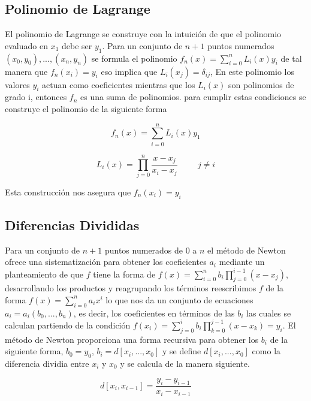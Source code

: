 \documentclass[10pt,twocolumn]{article}
\begin{document}
\subsection{Polinomio de Lagrange} 
El polinomio de Lagrange se construye con la intuici\'on de que el polinomio evaluado en $x_1$ debe ser 
$y_1$. Para un conjunto de $n+1$ puntos numerados $(x_0,y_0),...,(x_n,y_n)$ se formula el polinomio 
$f_n(x)=\sum_{i=0}^{n}L_i(x)y_i$ de tal manera que $f_n(x_i)=y_i$ eso 
implica que $L_i(x_j)=\delta_{ij}$, En este polinomio los valores $y_i$ actuan como coeficientes mientras 
que los $L_i(x)$ son polinomios de grado i, entonces $f_n$ es una suma de polinomios. para cumplir estas 
condiciones se construye 
el polinomio 
de la 
siguiente forma

\begin{equation}
	f_n(x)=\sum_{i=0}^{n}L_i(x)y_1
	\label{polf}
\end{equation}

\begin{equation}
	L_i(x)=\prod_{j=0}^{n}\frac{x-x_j}{x_i-x_j} \hspace{1cm} j\neq i
	\label{Lpol}
\end{equation}

Esta construcci\'on nos asegura que $f_n(x_i)=y_i$	

\subsection{Diferencias Divididas}
Para un conjunto de $n+1$ puntos numerados de 0 a $n$ el m\'etodo de Newton ofrece una sistematizaci\'on 
para obtener los coeficientes $a_i$ mediante un 
planteamiento de que $f$ tiene la forma de $f(x)=\sum_{i=0}^{n}b_i\prod_{j=0}^{i-1}(x-x_j)$, 
desarrollando 
los productos y reagrupando los t\'erminos reescribimos $f$ de la forma $f(x)=\sum_{i=0}^{n}a_ix^{i} $ lo 
que nos da un conjunto de ecuaciones $a_i=a_i(b_0,...,b_n)$, es decir, los coeficientes en t\'erminos 
de las $b_i$ las cuales se calculan partiendo de la condici\'on 
$f(x_i)=\sum_{j=0}^{i}b_i\prod_{k=0}^{j-1}(x-x_k)=y_i$. El m\'etodo de Newton proporciona una forma 
recursiva para obtener los $b_i$ de la siguiente forma, $b_0=y_0$, $b_i=d[x_i,...,x_0]$ y se define 
$d[x_i,...,x_0]$ como la diferencia dividia entre $x_i$ y $x_0$ y se calcula de la manera siguiente.

\begin{equation}
	d[x_i,x_{i-1}]=\frac{y_i-y_{i-1}}{x_i-x_{i-1}} \hspace{1cm}
	\label{dif}
\end{equation}
\end{document}
